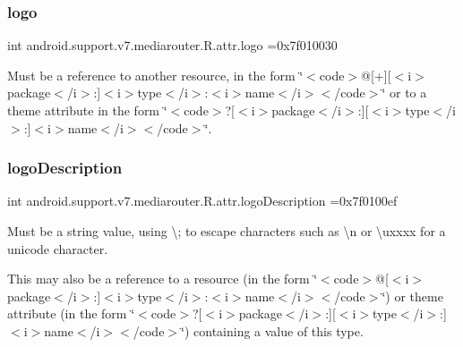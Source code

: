 \subsubsection{\texorpdfstring{logo}{logo}}
{\footnotesize\ttfamily int android.\+support.\+v7.\+mediarouter.\+R.\+attr.\+logo =0x7f010030\hspace{0.3cm}{\ttfamily [static]}}

Must be a reference to another resource, in the form \char`\"{}$<$code$>$@\mbox{[}+\mbox{]}\mbox{[}$<$i$>$package$<$/i$>$\+:\mbox{]}$<$i$>$type$<$/i$>$\+:$<$i$>$name$<$/i$>$$<$/code$>$\char`\"{} or to a theme attribute in the form \char`\"{}$<$code$>$?\mbox{[}$<$i$>$package$<$/i$>$\+:\mbox{]}\mbox{[}$<$i$>$type$<$/i$>$\+:\mbox{]}$<$i$>$name$<$/i$>$$<$/code$>$\char`\"{}. \mbox{\label{classandroid_1_1support_1_1v7_1_1mediarouter_1_1R_1_1attr_abbff551ca1e784343cf6ac9acf175951}} 
\subsubsection{\texorpdfstring{logo\+Description}{logoDescription}}
{\footnotesize\ttfamily int android.\+support.\+v7.\+mediarouter.\+R.\+attr.\+logo\+Description =0x7f0100ef\hspace{0.3cm}{\ttfamily [static]}}

Must be a string value, using \textquotesingle{}\textbackslash{};\textquotesingle{} to escape characters such as \textquotesingle{}\textbackslash{}n\textquotesingle{} or \textquotesingle{}\textbackslash{}uxxxx\textquotesingle{} for a unicode character. 

This may also be a reference to a resource (in the form \char`\"{}$<$code$>$@\mbox{[}$<$i$>$package$<$/i$>$\+:\mbox{]}$<$i$>$type$<$/i$>$\+:$<$i$>$name$<$/i$>$$<$/code$>$\char`\"{}) or theme attribute (in the form \char`\"{}$<$code$>$?\mbox{[}$<$i$>$package$<$/i$>$\+:\mbox{]}\mbox{[}$<$i$>$type$<$/i$>$\+:\mbox{]}$<$i$>$name$<$/i$>$$<$/code$>$\char`\"{}) containing a value of this type. \mbox{\label{classandroid_1_1support_1_1v7_1_1mediarouter_1_1R_1_1attr_aa93a1e8f467b0b783c9a9b2ec3ad6159}} 
